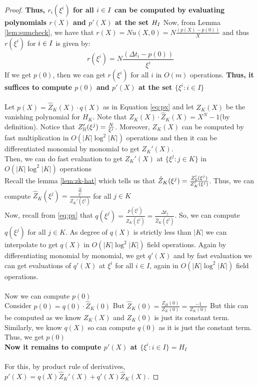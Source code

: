 \begin{proof}
    \textbf{Thus, $r_i(\xi^i)$ for all $i \in I$ can be computed by evaluating polynomials $r(X)$ and $p'(X)$ at the set $H_{I}$}
    Now, from Lemma \ref{lem:sumcheck}, we have that $r(X)=N u(X,0)=N \frac{(p(X) - p(0))}{X}$ and thus $r(\xi^i)$ for $i\in I$ is given by:
    $$r(\xi^i)=N \frac{(\Delta t_i - p(0))}{\xi^i}$$
    If we get $p(0)$, then we can get $r(\xi^i)$ for all $i$ in $O(m)$ operations.
    \textbf{Thus, it suffices to compute $p(0)$ and $p'(X)$ at the set $\{\xi^i:i \in I\}$}\\\\
    Let $p(X)=\widehat{Z}_K(X)\cdot q(X)$
    as in Equation \eqref{eq:px} and let $Z_K(X)$ be the vanishing polynomial for $H_K$.
    Note that $Z_K(X) \cdot \hat{Z}_K(X)=X^N-1$(by definition).
    Notice that $Z_{\mathbb{H}}'(\xi^j)= \frac{N}{\xi^j} $.
    Moreover, $Z_K(X)$ can be computed by fast multiplication in $O(|K|\log^2 |K|)$ operations and then it can be differentiated monomial by monomial to get $Z_K'(X)$.\\
    Then, we can do fast evaluation to get $Z_K'(X)$ at $\{\xi^j:j\in K\}$ in $O(|K|\log^2 |K|)$ operations\\
    Recall the lemma \ref{lem:zk-hat} which tells us that $\hat{Z}_K(\xi^j)=\frac{Z_{\mathbb{H}}'(\xi^j)}{Z_K'(\xi^j)}$.
    Thus, we can compute $\hat{Z}_K(\xi^j)=\frac{\frac{N}{\xi^j}}{Z_K'(\xi^j)}$ for all $j \in K$\\
    Now, recall from \eqref{eq:px} that $q(\xi^j)=\frac{p(\xi^j)}{\hat{Z}_K(\xi^j)}=\frac{\Delta t_j}{\widehat{Z}_K(\xi^j)}$.
    So, we can compute $q(\xi^j)$ for all $j \in K$.
    As degree of $q(X)$ is strictly less than $|K|$ we can interpolate to get $q(X)$ in $O(|K|\log^2 |K|)$ field operations.
    Again by differentiating monomial by monomial, we get $q'(X)$ and by fast evaluation we can get evaluations of $q'(X)$ at $\xi^i$ for all $i \in I$, again in $O(|K|\log^2 |K|)$ field operations.\\\\
    Now we can compute $p(0)$\\
    Consider $p(0)=q(0)\cdot \hat{Z}_K(0)$
    But $\hat{Z}_K(0)=\frac{Z_H(0)}{Z_K(0)}=\frac{-1}{Z_K(0)}$
    But this can be computed as we know $Z_K(X)$ and $Z_K(0)$ is just its constant term.
    Similarly, we know $q(X)$ so can compute $q(0)$ as it is just the constant term.
    Thus, we get $p(0)$\\
    \textbf{Now it remains to compute $p'(X)$ at $\{\xi^i:i \in I\}=H_I$\\\\}
    For this, by product rule of derivatives, $p'(X)=q(X) \hat{Z}_K'(X)+q'(X) \hat{Z}_K(X)$.


\end{proof}
